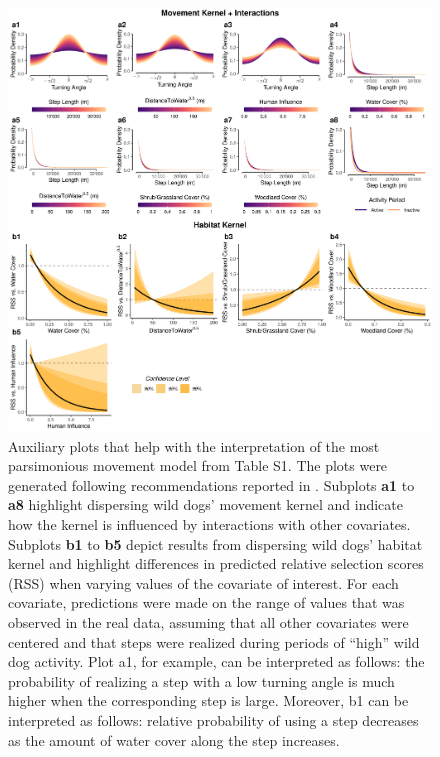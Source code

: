 \documentclass[abstract=off,10pt,a4paper,bibliography=totocnumbered]{article}
\begin{document}
\begin{figure}[hbtp]
 \begin{center}
  \includegraphics[width = \textwidth]{99_MovementModelInterpretation.png}
  \caption{Auxiliary plots that help with the interpretation of the most
   parsimonious movement model from Table S1. The plots were generated
   following recommendations reported in \cite{Fieberg.2021}. Subplots
   \textbf{a1} to \textbf{a8} highlight dispersing wild dogs' movement kernel
   and indicate how the kernel is influenced by interactions with other
   covariates. Subplots \textbf{b1} to \textbf{b5} depict results from
   dispersing wild dogs' habitat kernel and highlight differences in predicted
   relative selection scores (RSS) when varying values of the covariate of
   interest. For each covariate, predictions were made on the range of values
   that was observed in the real data, assuming that all other covariates were
   centered and that steps were realized during periods of ``high'' wild dog
   activity. Plot a1, for example, can be interpreted as follows: the
   probability of realizing a step with a low turning angle is much higher when
   the corresponding step is large. Moreover, b1 can be interpreted as follows:
   relative probability of using a step decreases as the amount of water cover
   along the step increases.}
  \label{Interpretation}
 \end{center}
\end{figure}
\end{document}
